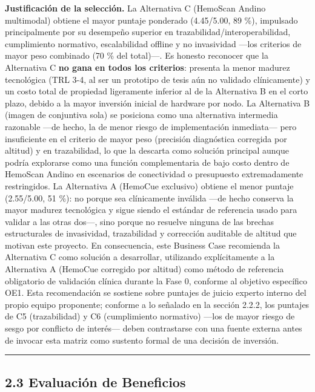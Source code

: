 \documentclass[11pt,a4paper]{article}
\begin{document}
\textbf{Justificación de la selección.} La Alternativa C (HemoScan Andino multimodal) obtiene el mayor puntaje ponderado (4.45/5.00, 89 \%), impulsado principalmente por su desempeño superior en trazabilidad/interoperabilidad, cumplimiento normativo, escalabilidad offline y no invasividad ---los criterios de mayor peso combinado (70 \% del total)---. Es honesto reconocer que la Alternativa C \textbf{no gana en todos los criterios}: presenta la menor madurez tecnológica (TRL 3-4, al ser un prototipo de tesis aún no validado clínicamente) y un costo total de propiedad ligeramente inferior al de la Alternativa B en el corto plazo, debido a la mayor inversión inicial de hardware por nodo. La Alternativa B (imagen de conjuntiva sola) se posiciona como una alternativa intermedia razonable ---de hecho, la de menor riesgo de implementación inmediata--- pero insuficiente en el criterio de mayor peso (precisión diagnóstica corregida por altitud) y en trazabilidad, lo que la descarta como solución principal aunque podría explorarse como una función complementaria de bajo costo dentro de HemoScan Andino en escenarios de conectividad o presupuesto extremadamente restringidos. La Alternativa A (HemoCue exclusivo) obtiene el menor puntaje (2.55/5.00, 51 \%): no porque sea clínicamente inválida ---de hecho conserva la mayor madurez tecnológica y sigue siendo el estándar de referencia usado para validar a las otras dos---, sino porque no resuelve ninguna de las brechas estructurales de invasividad, trazabilidad y corrección auditable de altitud que motivan este proyecto. En consecuencia, este Business Case recomienda la Alternativa C como solución a desarrollar, utilizando explícitamente a la Alternativa A (HemoCue corregido por altitud) como método de referencia obligatorio de validación clínica durante la Fase 0, conforme al objetivo específico OE1. Esta recomendación se sostiene sobre puntajes de juicio experto interno del propio equipo proponente; conforme a lo señalado en la sección 2.2.2, los puntajes de C5 (trazabilidad) y C6 (cumplimiento normativo) ---los de mayor riesgo de sesgo por conflicto de interés--- deben contrastarse con una fuente externa antes de invocar esta matriz como sustento formal de una decisión de inversión.

\begin{center}\rule{0.5\linewidth}{0.5pt}\end{center}

\subsection{2.3 Evaluación de Beneficios}\label{evaluaciuxf3n-de-beneficios}
\end{document}
